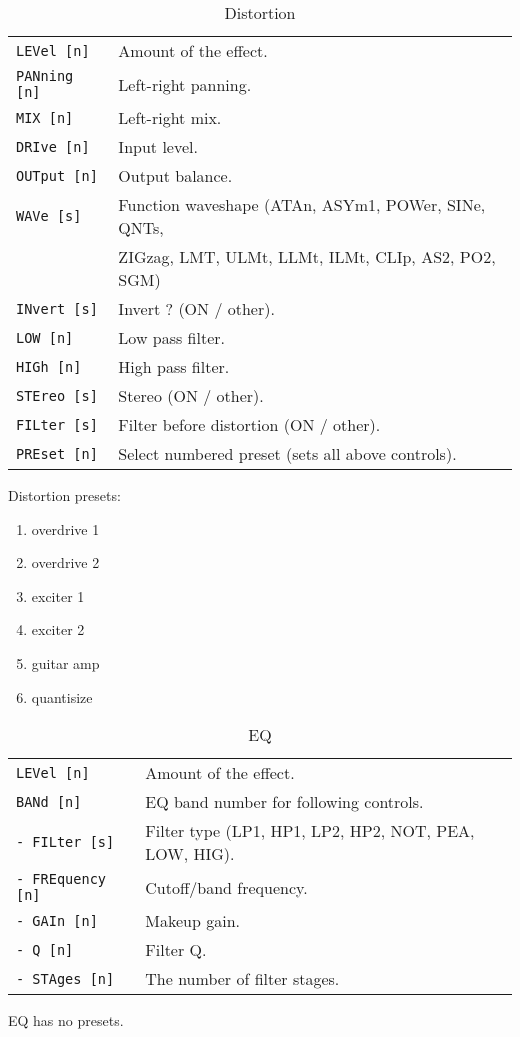    \begin{table}[H]
      \centering
      \caption{Distortion}
      \begin{tabular}{l l}
\texttt{LEVel [n]} &
   Amount of the effect. \\
\texttt{PANning [n]} &
   Left-right panning. \\
\texttt{MIX [n]} &
   Left-right mix. \\
\texttt{DRIve [n]} &
   Input level. \\
\texttt{OUTput [n]} &
   Output balance. \\
\texttt{WAVe [s]} &
   Function waveshape (ATAn, ASYm1, POWer, SINe, QNTs,\\
\texttt{ } &
    ZIGzag, LMT, ULMt, LLMt, ILMt, CLIp, AS2, PO2, SGM) \\
\texttt{INvert [s]} &
   Invert ?  (ON / other). \\
\texttt{LOW [n]} &
   Low pass filter. \\
\texttt{HIGh [n]} &
   High pass filter. \\
\texttt{STEreo [s]} &
   Stereo (ON / other). \\
\texttt{FILter [s]} &
   Filter before distortion (ON / other). \\
\texttt{PREset [n]} &
   Select numbered preset (sets all above controls). \\
      \end{tabular}
   \end{table}
Distortion presets:
   \begin{enumerate}
   \item overdrive 1
   \item overdrive 2
   \item exciter 1
   \item exciter 2
   \item guitar amp
   \item quantisize
   \end{enumerate}

   \begin{table}[H]
      \centering
      \caption{EQ}
      \begin{tabular}{l l}
\texttt{LEVel [n]} &
   Amount of the effect. \\
\texttt{BANd [n]} &
   EQ band number for following controls. \\
\texttt{- FILter [s]} &
   Filter type (LP1, HP1, LP2, HP2, NOT, PEA, LOW, HIG). \\
\texttt{- FREquency [n]} &
   Cutoff/band frequency. \\
\texttt{- GAIn [n]} &
   Makeup gain. \\
\texttt{- Q [n]} &
   Filter Q. \\
\texttt{- STAges [n]} &
   The number of filter stages. \\
      \end{tabular}
   \end{table}
EQ has no presets.

